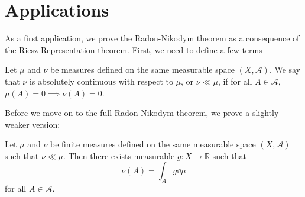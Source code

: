 \documentclass[twoside,symmetric, openany, 12pt]{./tuftebook}
\theoremstyle{definition}
\theoremstyle{definition}
\theoremstyle{definition}
\newcommand{\R}{\mathbb{R}}
\begin{document}
\section{Applications}
As a first application, we prove the Radon-Nikodym theorem as a consequence of the Riesz Representation theorem. First, we need to define a few terms

\begin{Definition}
	Let $\mu$ and $\nu$ be measures defined on the same measurable space $(X, \mathcal{A})$. We say that $\nu$ is absolutely continuous with respect to $\mu$, or $\nu \ll \mu$, if for all $A\in \mathcal{A}$, $\mu(A)=0\implies \nu(A)=0$.
\end{Definition}

Before we move on to the full Radon-Nikodym theorem, we prove a slightly weaker version:
\begin{Theorem}
	Let $\mu$ and $\nu$ be finite measures defined on the same measurable space $(X, \mathcal{A})$ such that $\nu \ll \mu$. Then there exists measurable $g:X \to \R$ such that
	\[\nu(A) = \int_A g \dd{\mu}\]
	for all $A\in \mathcal{A}$.
\end{Theorem}
\end{document}
